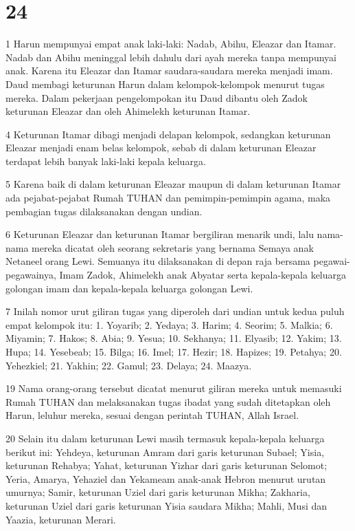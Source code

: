 \chapter{24}

\par 1 Harun mempunyai empat anak laki-laki: Nadab, Abihu, Eleazar dan Itamar. Nadab dan Abihu meninggal lebih dahulu dari ayah mereka tanpa mempunyai anak. Karena itu Eleazar dan Itamar saudara-saudara mereka menjadi imam. Daud membagi keturunan Harun dalam kelompok-kelompok menurut tugas mereka. Dalam pekerjaan pengelompokan itu Daud dibantu oleh Zadok keturunan Eleazar dan oleh Ahimelekh keturunan Itamar.
\par 4 Keturunan Itamar dibagi menjadi delapan kelompok, sedangkan keturunan Eleazar menjadi enam belas kelompok, sebab di dalam keturunan Eleazar terdapat lebih banyak laki-laki kepala keluarga.
\par 5 Karena baik di dalam keturunan Eleazar maupun di dalam keturunan Itamar ada pejabat-pejabat Rumah TUHAN dan pemimpin-pemimpin agama, maka pembagian tugas dilaksanakan dengan undian.
\par 6 Keturunan Eleazar dan keturunan Itamar bergiliran menarik undi, lalu nama-nama mereka dicatat oleh seorang sekretaris yang bernama Semaya anak Netaneel orang Lewi. Semuanya itu dilaksanakan di depan raja bersama pegawai-pegawainya, Imam Zadok, Ahimelekh anak Abyatar serta kepala-kepala keluarga golongan imam dan kepala-kepala keluarga golongan Lewi.
\par 7 Inilah nomor urut giliran tugas yang diperoleh dari undian untuk kedua puluh empat kelompok itu: 1. Yoyarib; 2. Yedaya; 3. Harim; 4. Seorim; 5. Malkia; 6. Miyamin; 7. Hakos; 8. Abia; 9. Yesua; 10. Sekhanya; 11. Elyasib; 12. Yakim; 13. Hupa; 14. Yesebeab; 15. Bilga; 16. Imel; 17. Hezir; 18. Hapizes; 19. Petahya; 20. Yehezkiel; 21. Yakhin; 22. Gamul; 23. Delaya; 24. Maazya.
\par 19 Nama orang-orang tersebut dicatat menurut giliran mereka untuk memasuki Rumah TUHAN dan melaksanakan tugas ibadat yang sudah ditetapkan oleh Harun, leluhur mereka, sesuai dengan perintah TUHAN, Allah Israel.
\par 20 Selain itu dalam keturunan Lewi masih termasuk kepala-kepala keluarga berikut ini: Yehdeya, keturunan Amram dari garis keturunan Subael; Yisia, keturunan Rehabya; Yahat, keturunan Yizhar dari garis keturunan Selomot; Yeria, Amarya, Yehaziel dan Yekameam anak-anak Hebron menurut urutan umurnya; Samir, keturunan Uziel dari garis keturunan Mikha; Zakharia, keturunan Uziel dari garis keturunan Yisia saudara Mikha; Mahli, Musi dan Yaazia, keturunan Merari.
